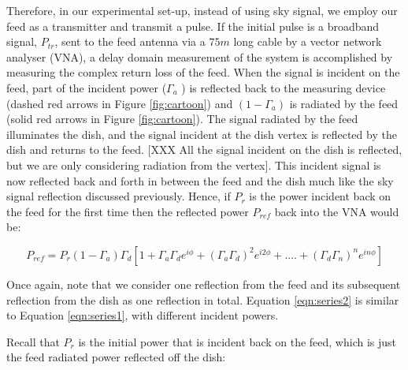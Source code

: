 \documentclass[12pt,preprint]{aastex}
\begin{document}

Therefore, in our experimental set-up, instead of using sky signal, we employ
our feed as a transmitter and transmit a pulse. If the initial pulse is a broadband signal,
$P_{tr}$, sent to the feed antenna via a $75m$ long cable by a vector network
analyser (VNA), a delay domain measurement of the system is accomplished by
measuring the complex return loss of the feed. When the signal is incident on
the feed, part of the incident power ($\Gamma_{a}$ ) is reflected back to the
measuring device (dashed red arrows in Figure \ref{fig:cartoon}) and
$(1-\Gamma_{a})$ is radiated by the feed (solid red arrows in Figure
\ref{fig:cartoon}). The signal radiated by the feed illuminates the dish, and
the signal incident at the dish vertex is reflected by the dish and returns to
the feed. [XXX All the signal incident on the dish is reflected, but we are
only considering radiation from the vertex]. This incident signal is now
reflected back and forth in between the feed and the dish much like the sky
signal reflection discussed previously.  Hence, if $P_{r}$ is the power
incident back on the feed for the first time then the reflected power $P_{ref}$
back into the VNA would be:

\begin{equation}\label{eqn:series2}
P_{ref} =  P_{r}(1-\Gamma_{a}) \Gamma_{d}[1+ \Gamma_{a}\Gamma_{d} e^{i\phi}+ (\Gamma_{a}\Gamma_{d})^2e^{i2\phi}+ ....+ (\Gamma_{d}\Gamma_{n})^{n}e^{in\phi}]
\end{equation}
 
Once again, note that we consider one reflection from the feed and its subsequent reflection from the dish as one reflection in total. Equation \ref{eqn:series2} is similar to Equation \ref{eqn:series1}, with different incident powers.

Recall that $P_{r}$ is the initial power that is incident back on the feed, which is just the feed radiated power reflected off the dish:
 
\end{document}
